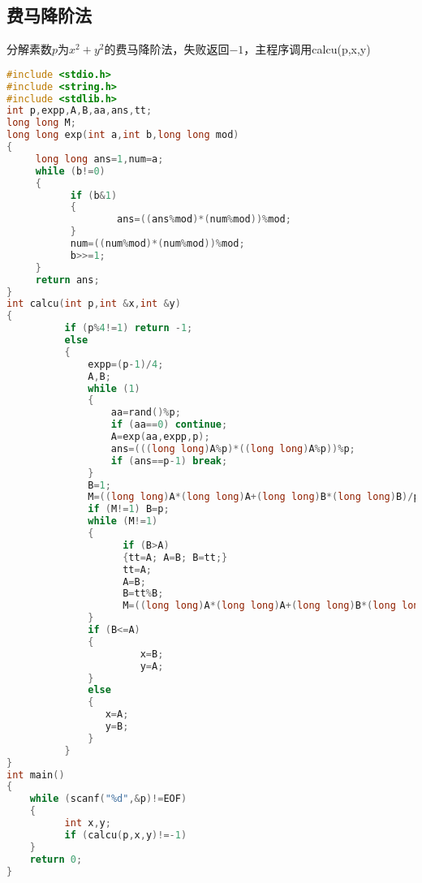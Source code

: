 \subsection{费马降阶法}
    分解素数$p$为$x^2+y^2$的费马降阶法，失败返回$-1$，主程序调用calcu(p,x,y)
    \begin{lstlisting}[language=c++]
#include <stdio.h>
#include <string.h>
#include <stdlib.h>
int p,expp,A,B,aa,ans,tt;
long long M;
long long exp(int a,int b,long long mod)
{
     long long ans=1,num=a;
     while (b!=0)
     {
           if (b&1)
           {
                   ans=((ans%mod)*(num%mod))%mod;
           }
           num=((num%mod)*(num%mod))%mod;
           b>>=1;
     }
     return ans;
}
int calcu(int p,int &x,int &y)
{
          if (p%4!=1) return -1;
          else
          {
              expp=(p-1)/4;
              A,B;
              while (1)
              {
                  aa=rand()%p;
                  if (aa==0) continue;
                  A=exp(aa,expp,p);
                  ans=(((long long)A%p)*((long long)A%p))%p;
                  if (ans==p-1) break;
              }
              B=1;
              M=((long long)A*(long long)A+(long long)B*(long long)B)/p;
              if (M!=1) B=p;
              while (M!=1)
              {
                    if (B>A)
                    {tt=A; A=B; B=tt;}
                    tt=A;
                    A=B;
                    B=tt%B;
                    M=((long long)A*(long long)A+(long long)B*(long long)B)/p;
              }
              if (B<=A)
              {
                       x=B;
                       y=A;
              }
              else
              {
                 x=A;
                 y=B;
              }
          }
}
int main()
{
    while (scanf("%d",&p)!=EOF)
    {
          int x,y;
          if (calcu(p,x,y)!=-1)
    }
    return 0;
}
    \end{lstlisting}
